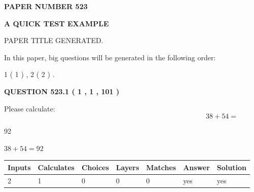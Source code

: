\documentclass[12pt]{article}
\begin{document}
   
   
   
 {\textbf{ \Large{ PAPER NUMBER  523  }}}
   
   
\vspace{0.2in}
   
   
   
   
   
   
   
   
 \vspace{0.2in}
{\LARGE {\textbf{ A QUICK TEST EXAMPLE}}}
   
   
 PAPER TITLE GENERATED.
   
   
   
\vspace{0.2in}
   
In this paper, big questions will be generated in the following order: 
   
   
   1 ( 1 )
 ,
   2 ( 2 )
 .
  
\vspace{0.2in}
  
{\textbf{\Large{QUESTION
523.1 
 ( 1 , 1 , 101 )
}}}
  
  
 
Please calculate:
\begin{equation}
38 +  %
54 = \nonumber
\end{equation}
 
 
 
\noindent{}
 
 

92
 
 
\noindent{}
 
 

 
 
 
\noindent{}
 
 

$ %
38 +  %
54=   %
92$
 
 
\noindent{}
 
 

 
   
   
   
   
\noindent\begin{tabular}{|l|l|l|l|l|l|l|}
 \hline
Inputs & Calculates & Choices & Layers & Matches & Answer & Solution \\ \hline
 2  & 
 1  & 
 0
  & 
 0  & 
 0  & 
  yes & 
  yes 
  \\ \hline
 \end{tabular}
   
\end{document}

